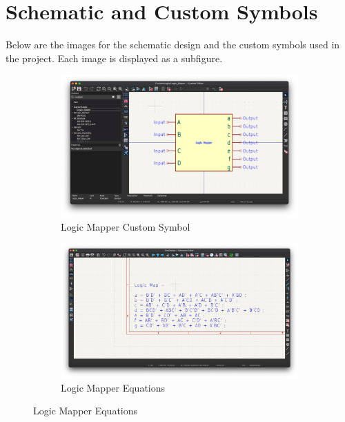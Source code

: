 \documentclass[a4paper,10pt]{article}
\begin{document}
\section*{Schematic and Custom Symbols}

Below are the images for the schematic design and the custom symbols used in the project. Each image is displayed as a subfigure.

\begin{figure}[h!]
    \centering
    \begin{subfigure}[b]{0.45\textwidth}
        \centering
        \includegraphics[width=\textwidth]{img/CustomSymbol.png}
        \caption{Logic Mapper Custom Symbol}
        \label{fig:schematic1}
    \end{subfigure}
    \hfill
    \begin{subfigure}[b]{0.45\textwidth}
        \centering
        \includegraphics[width=\textwidth]{img/LogicMap.png}
        \caption{Logic Mapper Equations}
        \label{fig:schematic2}
    \end{subfigure}
    

\end{figure}
\end{document}
